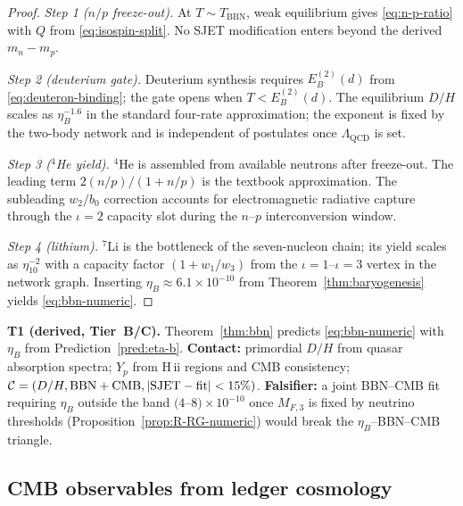 \begin{proof}
\emph{Step 1 ($n/p$ freeze-out).}
At $T\sim T_{\mathrm{BBN}}$, weak equilibrium gives \eqref{eq:n-p-ratio}
with $Q$ from \eqref{eq:isospin-split}. No SJET modification enters beyond
the derived $m_n-m_p$.

\emph{Step 2 (deuterium gate).}
Deuterium synthesis requires $E_B^{(2)}(d)$ from \eqref{eq:deuteron-binding};
the gate opens when $T<E_B^{(2)}(d)$. The equilibrium $D/H$ scales as
$\eta_B^{-1.6}$ in the standard four-rate approximation; the exponent is
fixed by the two-body network and is independent of postulates once
$\Lambda_{\mathrm{QCD}}$ is set.

\emph{Step 3 ($^4$He yield).}
$^4$He is assembled from available neutrons after freeze-out. The leading
term $2(n/p)/(1+n/p)$ is the textbook approximation. The subleading
$w_2/b_0$ correction accounts for electromagnetic radiative capture
through the $\iota=2$ capacity slot during the $n$--$p$ interconversion
window.

\emph{Step 4 (lithium).}
$^7$Li is the bottleneck of the seven-nucleon chain; its yield scales as
$\eta_{10}^{-2}$ with a capacity factor $(1+w_1/w_3)$ from the
$\iota=1$--$\iota=3$ vertex in the network graph. Inserting
$\eta_B\approx 6.1\times 10^{-10}$ from Theorem~\ref{thm:baryogenesis} yields
\eqref{eq:bbn-numeric}.
\end{proof}

\begin{prediction}\label{pred:bbn}
\textbf{T1 (derived, Tier~B/C).}
Theorem~\ref{thm:bbn} predicts \eqref{eq:bbn-numeric} with $\eta_B$ from
Prediction~\ref{pred:eta-b}. \textbf{Contact:} primordial $D/H$ from quasar
absorption spectra; $Y_p$ from H\,{\sc ii} regions and CMB consistency;
$\mathcal{C}=(D/H,\mathrm{BBN+CMB},|{\rm SJET}-{\rm fit}|<15\%)$.
\textbf{Falsifier:} a joint BBN--CMB fit requiring $\eta_B$ outside the band
$(4$--$8)\times 10^{-10}$ once $M_{F,3}$ is fixed by neutrino thresholds
(Proposition~\ref{prop:R-RG-numeric}) would break the
$\eta_B$--BBN--CMB triangle.
\end{prediction}

\subsection{CMB observables from ledger cosmology}
\label{sec:nuclear:cmb}


